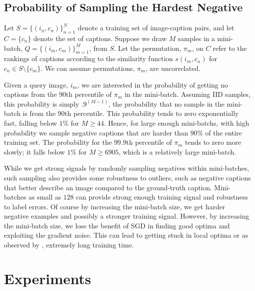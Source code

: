 \subsection{Probability of Sampling the Hardest Negative}
\label{sec:prob_hard_neg}

Let $S=\{(i_n, c_n)\}^N_{n=1}$ denote a training set of image-caption pairs,
and let $C=\{c_n\}$ denote the set of captions.  Suppose we draw $M$ samples 
in a mini-batch, $Q=\{(i_m, c_m)\}^M_{m=1}$, from $S$.  Let the permutation, 
$\pi_m$, on $C$ refer to the rankings of captions according to the similarity 
function $s(i_m,c_n)$ for $c_n\in S\setminus\{c_m\}$. We can assume 
permutations, $\pi_m$, are uncorrelated.

Given a query image, $i_m$, we are interested in the probability of getting 
no captions from the $90$th percentile of $\pi_m$ in the mini-batch. 
Assuming IID samples, this probability is simply $.9^{(M-1)}$, the probability 
that no sample in the mini-batch is from the $90$th percentile. 
This probability tends to zero exponentially fast, falling below $1\%$ 
for $M\geq 44$. Hence, for large enough mini-batchs, with high probability 
we sample negative captions that are harder 
than $90\%$ of the entire training set.
The probability for the $99.9$th percentile of $\pi_m$ tends to zero 
more slowly; it falls below $1\%$ for $M\geq 6905$, which is a relatively 
large mini-batch. 

While we get strong signals  by randomly 
sampling negatives within mini-batches, such sampling also provides 
some robustness to outliers, such as negative captions that 
better describe an image compared to the ground-truth caption.
Mini-batches as small as $128$ can provide strong 
enough training signal and robustness to label errors. Of course by 
increasing the mini-batch size, we get harder negative examples and possibly 
a stronger training signal.  However, by increasing the mini-batch size, we lose 
the benefit of SGD in finding good optima and exploiting the gradient noise.  
This can lead to getting stuck in local optima or as observed by 
\cite{schroff2015facenet}, extremely long training time.





 \section{Experiments}

